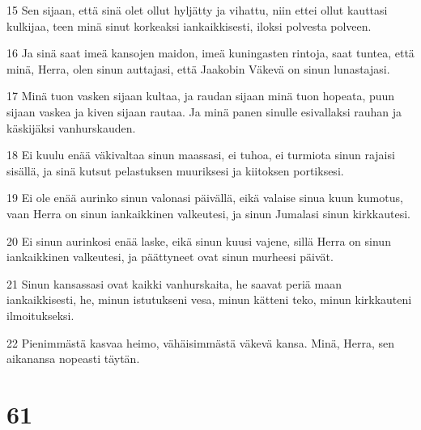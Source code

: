 \par 15 Sen sijaan, että sinä olet ollut hyljätty ja vihattu, niin ettei ollut kauttasi kulkijaa, teen minä sinut korkeaksi iankaikkisesti, iloksi polvesta polveen.
\par 16 Ja sinä saat imeä kansojen maidon, imeä kuningasten rintoja, saat tuntea, että minä, Herra, olen sinun auttajasi, että Jaakobin Väkevä on sinun lunastajasi.
\par 17 Minä tuon vasken sijaan kultaa, ja raudan sijaan minä tuon hopeata, puun sijaan vaskea ja kiven sijaan rautaa. Ja minä panen sinulle esivallaksi rauhan ja käskijäksi vanhurskauden.
\par 18 Ei kuulu enää väkivaltaa sinun maassasi, ei tuhoa, ei turmiota sinun rajaisi sisällä, ja sinä kutsut pelastuksen muuriksesi ja kiitoksen portiksesi.
\par 19 Ei ole enää aurinko sinun valonasi päivällä, eikä valaise sinua kuun kumotus, vaan Herra on sinun iankaikkinen valkeutesi, ja sinun Jumalasi sinun kirkkautesi.
\par 20 Ei sinun aurinkosi enää laske, eikä sinun kuusi vajene, sillä Herra on sinun iankaikkinen valkeutesi, ja päättyneet ovat sinun murheesi päivät.
\par 21 Sinun kansassasi ovat kaikki vanhurskaita, he saavat periä maan iankaikkisesti, he, minun istutukseni vesa, minun kätteni teko, minun kirkkauteni ilmoitukseksi.
\par 22 Pienimmästä kasvaa heimo, vähäisimmästä väkevä kansa. Minä, Herra, sen aikanansa nopeasti täytän.

\chapter{61}

